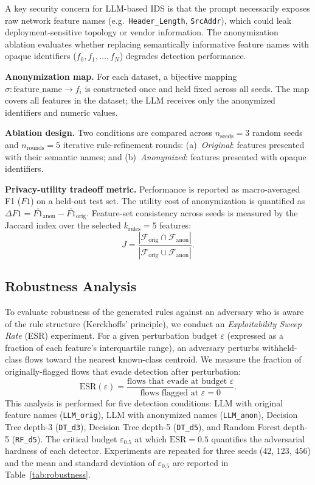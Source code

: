 A key security concern for LLM-based IDS is that the prompt necessarily exposes
raw network feature names (e.g.\ \texttt{Header\_Length}, \texttt{SrcAddr}),
which could leak deployment-sensitive topology or vendor information. The
anonymization ablation evaluates whether replacing semantically informative
feature names with opaque identifiers ($f_0, f_1, \ldots, f_N$) degrades
detection performance.

\textbf{Anonymization map.} For each dataset, a bijective mapping
$\sigma: \text{feature\_name} \to f_i$ is constructed once and held fixed
across all seeds. The map covers all features in the dataset; the LLM
receives only the anonymized identifiers and numeric values.

\textbf{Ablation design.} Two conditions are compared across $n_{\text{seeds}}=3$
random seeds and $n_{\text{rounds}}=5$ iterative rule-refinement rounds:
(a)~\emph{Original}: features presented with their semantic names; and
(b)~\emph{Anonymized}: features presented with opaque identifiers.

\textbf{Privacy-utility tradeoff metric.} Performance is reported as
macro-averaged F1 ($\overline{F1}$) on a held-out test set. The utility
cost of anonymization is quantified as $\Delta F1 = \overline{F1}_{\text{anon}}
- \overline{F1}_{\text{orig}}$. Feature-set consistency across seeds is measured
by the Jaccard index over the selected $k_{\text{rules}} = 5$ features:
\[
  J = \frac{\left| \mathcal{F}_{\text{orig}} \cap \mathcal{F}_{\text{anon}} \right|}
           {\left| \mathcal{F}_{\text{orig}} \cup \mathcal{F}_{\text{anon}} \right|} .
\]

\subsection{Robustness Analysis}\label{subsec:smcc}

To evaluate robustness of the generated rules against an adversary who is aware
of the rule structure (Kerckhoffs' principle), we conduct an
\emph{Exploitability Sweep Rate} (ESR) experiment. For a given perturbation
budget $\varepsilon$ (expressed as a fraction of each feature's interquartile
range), an adversary perturbs withheld-class flows toward the nearest
known-class centroid. We measure the fraction of originally-flagged flows that
evade detection after perturbation:
\[
  \mathrm{ESR}(\varepsilon) = \frac{\text{flows that evade at budget } \varepsilon}
                                   {\text{flows flagged at } \varepsilon = 0} .
\]
This analysis is performed for five detection conditions: LLM with original
feature names (\texttt{LLM\_orig}), LLM with anonymized names
(\texttt{LLM\_anon}), Decision Tree depth-3 (\texttt{DT\_d3}), Decision Tree
depth-5 (\texttt{DT\_d5}), and Random Forest depth-5 (\texttt{RF\_d5}).
The critical budget $\varepsilon_{0.5}$ at which $\mathrm{ESR} = 0.5$ quantifies
the adversarial hardness of each detector. Experiments are repeated for three
seeds (42, 123, 456) and the mean and standard deviation of $\varepsilon_{0.5}$
are reported in Table~\ref{tab:robustness}.
